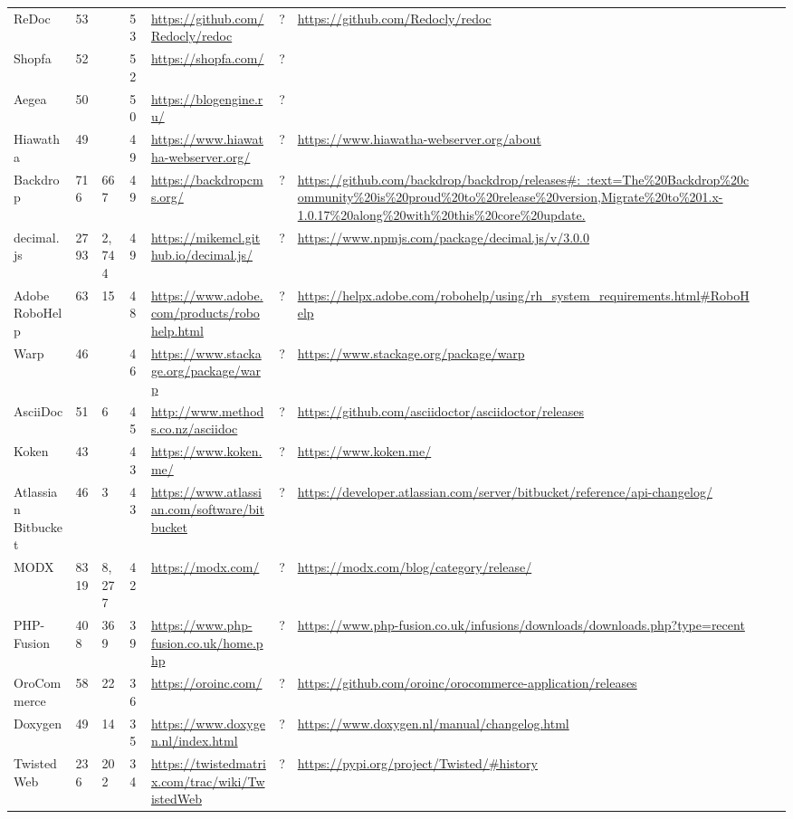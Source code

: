 \begin{table}[!htp]
\begin{tabular}{|l|l|l|l|l|l|l|l|l|}
				ReDoc &53 & &53 &\ul{https://github.com/Redocly/redoc} &? &\ul{https://github.com/Redocly/redoc} & \\
				Shopfa &52 & &52 &\ul{https://shopfa.com/} &? & & \\
				Aegea &50 & &50 &\ul{https://blogengine.ru/} &? & & \\
				Hiawatha &49 & &49 &\ul{https://www.hiawatha-webserver.org/} &? &\ul{https://www.hiawatha-webserver.org/about} & \\
				Backdrop &716 &667 &49 &\ul{https://backdropcms.org/} &? &\ul{https://github.com/backdrop/backdrop/releases\#:~:text=The\%20Backdrop\%20community\%20is\%20proud\%20to\%20release\%20version,Migrate\%20to\%201.x-1.0.17\%20along\%20with\%20this\%20core\%20update.} & \\
				decimal.js &2793 &2,744 &49 &\ul{https://mikemcl.github.io/decimal.js/} &? &\ul{https://www.npmjs.com/package/decimal.js/v/3.0.0} & \\
				Adobe RoboHelp &63 &15 &48 &\ul{https://www.adobe.com/products/robohelp.html} &? &\ul{https://helpx.adobe.com/robohelp/using/rh\_system\_requirements.html\#RoboHelp} & \\
				Warp &46 & &46 &\ul{https://www.stackage.org/package/warp} &? &\ul{https://www.stackage.org/package/warp} & \\
				AsciiDoc &51 &6 &45 &\ul{http://www.methods.co.nz/asciidoc} &? &\ul{https://github.com/asciidoctor/asciidoctor/releases} & \\
				Koken &43 & &43 &\ul{https://www.koken.me/} &? &\ul{https://www.koken.me/} & \\
				Atlassian Bitbucket &46 &3 &43 &\ul{https://www.atlassian.com/software/bitbucket} &? &\ul{https://developer.atlassian.com/server/bitbucket/reference/api-changelog/} & \\
				MODX &8319 &8,277 &42 &\ul{https://modx.com/} &? &\ul{https://modx.com/blog/category/release/} & \\
				PHP-Fusion &408 &369 &39 &\ul{https://www.php-fusion.co.uk/home.php} &? &\ul{https://www.php-fusion.co.uk/infusions/downloads/downloads.php?type=recent} & \\
				OroCommerce &58 &22 &36 &\ul{https://oroinc.com/} &? &\ul{https://github.com/oroinc/orocommerce-application/releases} & \\
				Doxygen &49 &14 &35 &\ul{https://www.doxygen.nl/index.html} &? &\ul{https://www.doxygen.nl/manual/changelog.html} & \\
				TwistedWeb &236 &202 &34 &\ul{https://twistedmatrix.com/trac/wiki/TwistedWeb} &? &\ul{https://pypi.org/project/Twisted/\#history} & \\

\end{tabular}
\end{table}
